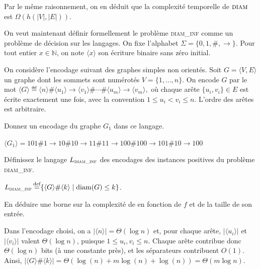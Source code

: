 \begin{exercice}
\begin{corrections}
    Par le même raisonnement, on en déduit que
    la complexité temporelle de $\textsc{diam}$ est $\Omega(h(|V|, |E|))$.
  \end{corrections}

  On veut maintenant définir formellement le problème \textsc{diam\_inf} comme un problème de décision sur les langages.
  On fixe l'alphabet $\Sigma = \{0,1,\#,\rightarrow\}$.
  Pour tout entier $x\in\mathbb{N}$, on note $\langle x\rangle$ son écriture binaire sans zéro initial.

  On considère l'encodage suivant des graphes simples non orientés.
  Soit $G=\langle V,E\rangle$ un graphe dont les sommets sont numérotés
  $V=\{1,\dots,n\}$.
  On encode $G$ par le mot
  $
  \langle G\rangle \eqdef
  \langle n\rangle
  \#
  \langle u_1\rangle \rightarrow \langle v_1\rangle
  \# \cdots \#
  \langle u_m\rangle \rightarrow \langle v_m\rangle,
  $
  où chaque arête $\{u_i,v_i\}\in E$ est écrite exactement une fois, avec la convention
  $1 \le u_i < v_i \le n$.
  L'ordre des arêtes est arbitraire.

  \begin{questions}
  \item Donnez un encodage du graphe $G_1$ dans ce langage.
  \end{questions}
  \begin{corrections}
    $\langle G_1 \rangle = 101\#1\rightarrow10\#10\rightarrow11\#11\rightarrow100\#100\rightarrow101\#10\rightarrow100$
  \end{corrections}

  \begin{questions}
    \item Définissez le langage $L_{\textsc{diam\_inf}}$ des encodages des instances positives du problème \textsc{diam\_inf}.
  \end{questions}
  \begin{corrections}
    $L_{\textsc{diam\_inf}} \operatorname{\stackrel{\text{def}}{=}} \{ \langle G \rangle \# \langle k \rangle \mid \mathrm{diam}(G) \le k \}$.
  \end{corrections}

  \begin{questions}
  \item En déduire une borne sur la complexité de \Diam en fonction de $f$ et de la taille de son entrée. 
  \end{questions}
  \begin{corrections}
    Dans l'encodage choisi, on a $|\langle n\rangle| = \Theta(\log n)$ et,
    pour chaque arête, $|\langle u_i\rangle|$ et $|\langle v_i\rangle|$ valent $\Theta(\log n)$, puisque $1\le u_i,v_i\le n$.
    Chaque arête contribue donc $\Theta(\log n)$ bits (à une constante près), et les séparateurs contribuent $O(1)$.
    Ainsi, $|\langle G \rangle \# \langle k \rangle| = \Theta(\log(n) + m\log(n) + \log(n)) = \Theta(m\log n)$.


\end{corrections}
\end{exercice}
